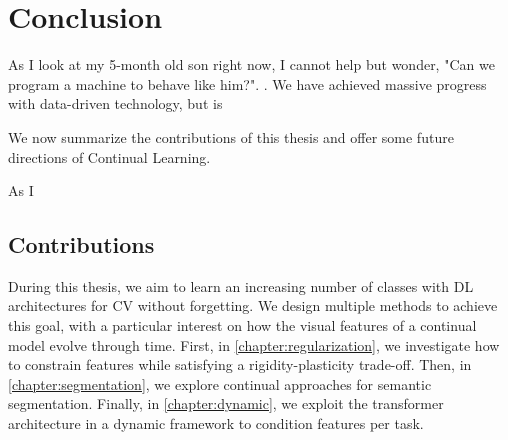 \chapter{Conclusion}
\label{chapter:conclusion}

{}






As I look at my 5-month old son right now, I cannot help but wonder, "Can we program a machine to behave like him?". . We have achieved massive progress 
with data-driven technology, but is 



We now summarize the contributions of this thesis and offer some future directions of Continual
Learning.

As I 

\section{Contributions}

During this thesis, we aim to learn an increasing number of classes with \ac{DL} architectures for
\ac{CV} without forgetting. We design multiple methods to achieve this goal, with a particular
interest on how the visual features of a continual model evolve through time. First, in
\autoref{chapter:regularization}, we investigate how to constrain features while satisfying a
rigidity-plasticity trade-off. Then, in \autoref{chapter:segmentation}, we explore continual
approaches for semantic segmentation. Finally, in \autoref{chapter:dynamic}, we exploit the
transformer architecture in a dynamic framework to condition features per task.

